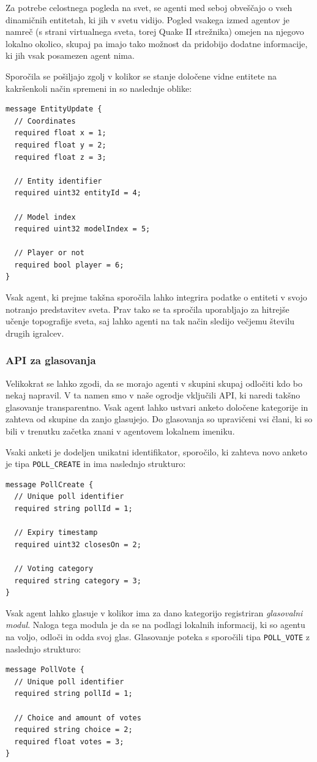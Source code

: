 \documentclass[a4paper,10pt]{article}
\begin{document}
Za potrebe celostnega pogleda na svet, se agenti med seboj obveščajo o vseh dinamičnih entitetah, ki jih v svetu vidijo. Pogled vsakega izmed agentov je namreč (s strani virtualnega sveta, torej Quake II strežnika) omejen na njegovo lokalno okolico, skupaj pa imajo tako možnost da pridobijo dodatne informacije, ki jih vsak posamezen agent nima.

Sporočila se pošiljajo zgolj v kolikor se stanje določene vidne entitete na kakršenkoli način spremeni in so naslednje oblike:
\begin{verbatim}
message EntityUpdate {
  // Coordinates
  required float x = 1;
  required float y = 2;
  required float z = 3;
  
  // Entity identifier
  required uint32 entityId = 4;
  
  // Model index
  required uint32 modelIndex = 5;
  
  // Player or not
  required bool player = 6;
}
\end{verbatim}

\noindent
Vsak agent, ki prejme takšna sporočila lahko integrira podatke o entiteti v svojo notranjo predstavitev sveta. Prav tako se ta spročila uporabljajo za hitrejše učenje topografije sveta, saj lahko agenti na tak način sledijo večjemu številu drugih igralcev.

\subsubsection{API za glasovanja}

Velikokrat se lahko zgodi, da se morajo agenti v skupini skupaj odločiti kdo bo nekaj napravil. V ta namen smo v naše ogrodje vključili API, ki naredi takšno glasovanje transparentno. Vsak agent lahko ustvari anketo določene kategorije in zahteva od skupine da zanjo glasujejo. Do glasovanja so upravičeni vsi člani, ki so bili v trenutku začetka znani v agentovem lokalnem imeniku.

Vsaki anketi je dodeljen unikatni identifikator, sporočilo, ki zahteva novo anketo je tipa \texttt{POLL\_CREATE} in ima naslednjo strukturo:
\begin{verbatim}
message PollCreate {
  // Unique poll identifier
  required string pollId = 1;
  
  // Expiry timestamp
  required uint32 closesOn = 2;
  
  // Voting category
  required string category = 3;
}
\end{verbatim}

Vsak agent lahko glasuje v kolikor ima za dano kategorijo registriran \textit{glasovalni modul}. Naloga tega modula je da se na podlagi lokalnih informacij, ki so agentu na voljo, odloči in odda svoj glas. Glasovanje poteka s sporočili tipa \texttt{POLL\_VOTE} z naslednjo strukturo:
\begin{verbatim}
message PollVote {
  // Unique poll identifier
  required string pollId = 1;
  
  // Choice and amount of votes
  required string choice = 2;
  required float votes = 3;
}
\end{verbatim}
\end{document}
